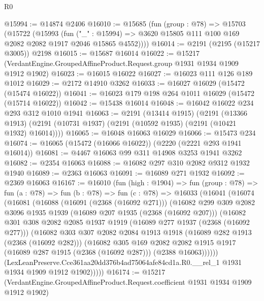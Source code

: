 \begin{lexlean}{R0}
\begin{coremodule}
@15994 := @14874 @2406
@16010 := @15685
    (fun (group : @78) =>
    @15703
      (@15722
        (@15993
          (fun ("_" : @15994) =>
          @3620 @15805 @111 @100 @169 @2082 @2082 @1917 @2046 @15865 @4552))))
@16014 := @2191 (@2195 (@15217 @3005)) @2198
@16015 := @15687 @16014
@16022 := @15217 (VerdantEngine.GroupedAffineProduct.Request.group @1931 @1934 @1909 @1912 @1902)
@16023 := @16015 @16022
@16027 := @16023 @111 @126 @189 @1012
@16029 := @2172 @14910 @3262
@16033 := @16027 @16029 (@15472 (@15474 @16022))
@16041 := @16023 @179 @198 @264 @1011 @16029 (@15472 (@15714 @16022))
@16042 := @15438 @16014
@16048 := @16042 @16022 @234 @293 @312 @1010 @1941
@16063 := @2191
    (@13414 @1915)
    (@2191
      (@13366 @1913)
      (@2191 (@10731 @1937) (@2191 (@10592 @1935) (@2191 (@10421 @1932) @16014))))
@16065 := @16048 @16063 @16029
@16066 := @15473 @234
@16074 := @16065 (@15472 (@16066 @16022)) (@2220 (@2221 @293 @1941 @16014))
@16081 := @4467 @16063 @99 @311 @14908 @3253 @1941 @3262
@16082 := @2354 @16063
@16088 := @16082 @297 @310 @2082 @9312 @1932 @1940
@16089 := @2363 @16063
@16091 := @16089 @271 @1932
@16092 := @2369 @16063
@16167 := @16010
    (fun (high : @1904) =>
    fun (group : @78) =>
    fun (a : @78) =>
    fun (b : @78) =>
    fun (c : @78) =>
    @16033
      (@16041
        (@16074
          (@16081
            (@16088
              (@16091 (@2368 (@16092 @271)))
              (@16082
                @299
                @309
                @2082
                @3096
                @1935
                @1939
                (@16089 @207 @1935 (@2368 (@16092 @207)))
                (@16082
                  @301
                  @308
                  @2082
                  @2085
                  @1937
                  @1919
                  (@16089 @277 @1937 (@2368 (@16092 @277)))
                  (@16082
                    @303
                    @307
                    @2082
                    @2084
                    @1913
                    @1918
                    (@16089 @282 @1913 (@2368 (@16092 @282)))
                    (@16082
                      @305
                      @169
                      @2082
                      @2082
                      @1915
                      @1917
                      (@16089 @287 @1915 (@2368 (@16092 @287)))
                      (@2388 @16063))))))
            (LexLeanPreserve.Cce361aa20dd376b4ad75064afe84cd1a.R0.__rel_1
              @1931
              @1934
              @1909
              @1912
              @1902)))))
@16174 := @15217
    (VerdantEngine.GroupedAffineProduct.Request.coefficient @1931 @1934 @1909 @1912 @1902)

\end{coremodule}
\end{lexlean}
